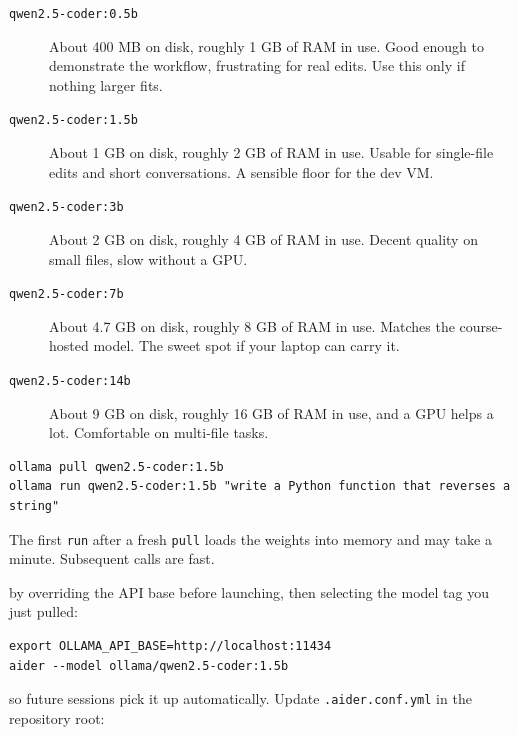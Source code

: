 \begin{description}
    \item[\texttt{qwen2.5-coder:0.5b}] About 400 MB on disk, roughly 1 GB of RAM in use. Good
    enough to demonstrate the workflow, frustrating for real edits. Use this only if nothing
    larger fits.
    \item[\texttt{qwen2.5-coder:1.5b}] About 1 GB on disk, roughly 2 GB of RAM in use. Usable for
    single-file edits and short conversations. A sensible floor for the dev VM.
    \item[\texttt{qwen2.5-coder:3b}] About 2 GB on disk, roughly 4 GB of RAM in use. Decent quality
    on small files, slow without a GPU.
    \item[\texttt{qwen2.5-coder:7b}] About 4.7 GB on disk, roughly 8 GB of RAM in use. Matches the
    course-hosted model. The sweet spot if your laptop can carry it.
    \item[\texttt{qwen2.5-coder:14b}] About 9 GB on disk, roughly 16 GB of RAM in use, and a GPU
    helps a lot. Comfortable on multi-file tasks.
\end{description}



\begin{verbatim}
ollama pull qwen2.5-coder:1.5b
ollama run qwen2.5-coder:1.5b "write a Python function that reverses a string"
\end{verbatim}

The first \texttt{run} after a fresh \texttt{pull} loads the weights into memory and may take a
minute. Subsequent calls are fast.

 by overriding the API base before launching, then
selecting the model tag you just pulled:

\begin{verbatim}
export OLLAMA_API_BASE=http://localhost:11434
aider --model ollama/qwen2.5-coder:1.5b
\end{verbatim}

 so future sessions pick it up automatically. Update
\texttt{.aider.conf.yml} in the repository root:

